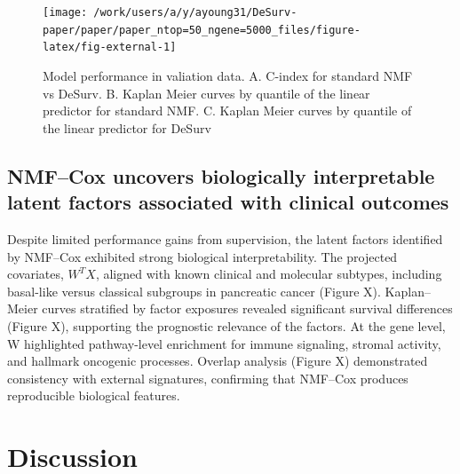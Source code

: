 \documentclass[9pt,twocolumn,twoside,]{pnas-new}
\begin{document}
\begin{figure}[t]

{\centering \texttt{[image: /work/users/a/y/ayoung31/DeSurv-paper/paper/paper\_ntop=50\_ngene=5000\_files/figure-latex/fig-external-1]} 

}

\caption{Model performance in valiation data. A. C-index for standard NMF vs DeSurv. B. Kaplan Meier curves by quantile of the linear predictor for standard NMF. C. Kaplan Meier curves by quantile of the linear predictor for DeSurv}\label{fig:fig-external}
\end{figure}

\subsection{NMF--Cox uncovers biologically interpretable latent factors
associated with clinical
outcomes}\label{nmfcox-uncovers-biologically-interpretable-latent-factors-associated-with-clinical-outcomes}

Despite limited performance gains from supervision, the latent factors
identified by NMF--Cox exhibited strong biological interpretability. The
projected covariates, \(W^TX\), aligned with known clinical and
molecular subtypes, including basal-like versus classical subgroups in
pancreatic cancer (Figure X). Kaplan--Meier curves stratified by factor
exposures revealed significant survival differences (Figure X),
supporting the prognostic relevance of the factors. At the gene level, W
highlighted pathway-level enrichment for immune signaling, stromal
activity, and hallmark oncogenic processes. Overlap analysis (Figure X)
demonstrated consistency with external signatures, confirming that
NMF--Cox produces reproducible biological features.

\section*{Discussion}\label{discussion}

\showmatmethods
\showacknow
\pnasbreak



% 
\end{document}
